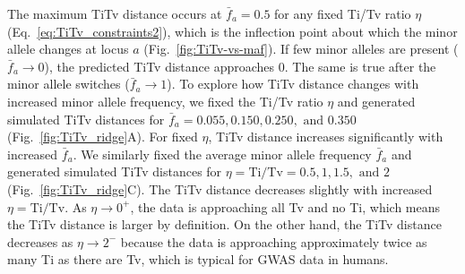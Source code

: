 \documentclass[aoas]{imsart}
\begin{document}
The maximum TiTv distance occurs at $\bar{f}_a=0.5$ for any fixed Ti/Tv ratio $\eta$ (Eq.~\ref{eq:TiTv_constraints2}), which is the inflection point about which the minor allele changes at locus $a$ (Fig.~\ref{fig:TiTv-vs-maf}). If few minor alleles are present ($\bar{f}_a \to 0$), the predicted TiTv distance approaches 0. The same is true after the minor allele switches ($\bar{f}_a \to 1$). To explore how TiTv distance changes with increased minor allele frequency, we fixed the Ti/Tv ratio $\eta$ and generated simulated TiTv distances for $\bar{f}_a = 0.055, 0.150, 0.250, \text{ and } 0.350$ (Fig.~\ref{fig:TiTv_ridge}A). For fixed $\eta$, TiTv distance increases significantly with increased $\bar{f}_a$. We similarly fixed the average minor allele frequency $\bar{f}_a$ and generated simulated TiTv distances for $\eta = \text{Ti/Tv} = 0.5, 1, 1.5, \text{ and } 2$ (Fig.~\ref{fig:TiTv_ridge}C). The TiTv distance decreases slightly with increased $\eta = \text{Ti/Tv}$. As $\eta \to 0^+$, the data is approaching all Tv and no Ti, which means the TiTv distance is larger by definition. On the other hand, the TiTv distance decreases as $\eta \to 2^-$ because the data is approaching approximately twice as many Ti as there are Tv, which is typical for GWAS data in humans.
\end{document}
